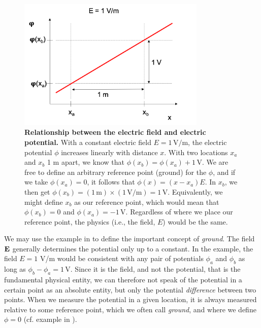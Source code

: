 \begin{figure}[!ht]
\begin{center}
\includegraphics[width=0.8\textwidth]{Figures/Basics/Ground.png}
\end{center}
\caption{\textbf{Relationship between the electric field and electric potential.} With a constant electric field $E = 1\,\si{\volt\per\metre}$, the electric potential $\phi$ increases linearly with distance $x$. With two locations $x_a$ and $x_b$ 1 \si{\metre} apart, we know that $\phi(x_b) = \phi(x_a) + 1\,\si{\volt}$. We are free to define an arbitrary reference point (ground) for the $\phi$, and if we take $\phi(x_a) = 0$, it follows that $\phi(x) = (x-x_a)E$. In $x_b$, we then get $\phi(x_b)=(1\,\si{\metre})\times(1\, \si{\volt\per\metre}) =1\,\si{\volt}$. Equivalently, we might define $x_b$ as our reference point, which would mean that $\phi(x_b) = 0$ and $\phi(x_a) = -1\,\si{\volt}$. Regardless of where we place our reference point, the physics (i.e., the field, $E$) would be the same.
}
\label{fig:Basics:Ground}
\end{figure}

We may use the example in  to define the important concept of \textit{ground}. The field ${\bf E}$ generally determines the potential only up to a constant. In the example, the field $E = 1$ V/m would be consistent with any pair of potentials $\phi_a$ and $\phi_b$ as long as $\phi_b - \phi_a =  1 \,\si{\volt}$. Since it is the field, and not the potential, that is the fundamental physical entity, we can therefore not speak of the potential in a certain point as an absolute entity, but only the potential \textit{difference} between two points. When we measure the potential in a given location, it is always measured relative to some reference point, which we often call \textit{ground}, and where we define $\phi = 0$ (cf. example in ). 

